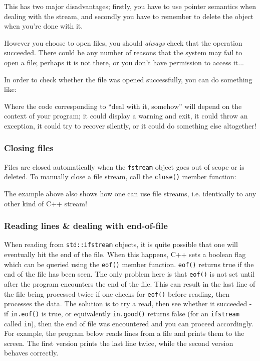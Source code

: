 \documentclass[a4paper]{scrartcl}
\begin{document}
This has two major disadvantages; firstly, you have to use pointer semantics when dealing with the stream, and secondly you have to remember to delete the object when you're done with it.

However you choose to open files, you should \emph{always} check that the operation succeeded. There could be any number of reasons that the system may fail to open a file; perhaps it is not there, or you don't have permission to access it...

In order to check whether the file was opened successfully, you can do something like:


Where the code corresponding to ``deal with it, somehow'' will depend on the context of your program; it could display a warning and exit, it could throw an exception, it could try to recover silently, or it could do something else altogether!

\subsubsection{Closing files}
Files are closed automatically when the \verb|fstream| object goes out of scope or is deleted. To manually close a file stream, call the \verb|close()| member function:


The example above also shows how one can use file streams, i.e. identically to any other kind of C++ stream!

\subsubsection{Reading lines \& dealing with end-of-file}
When reading from \verb|std::ifstream| objects, it is quite possible that one will eventually hit the end of the file. When this happens, C++ sets a boolean flag which can be queried using the \verb|eof()| member function. \verb|eof()| returns true if the end of the file has been seen. The only problem here is that \verb|eof()| is not set until after the program encounters the end of the file. This can result in the last line of the file being processed twice if one checks for \verb|eof()| before reading, then processes the data. The solution is to try a read, then see whether it succeeded - if \verb|in.eof()| is true, or equivalently \verb|in.good()| returns false (for an \verb|ifstream| called \verb|in|), then the end of file was encountered and you can proceed accordingly. For example, the program below reads lines from a file and prints them to the screen. The first version prints the last line twice, while the second version behaves correctly.
\end{document}
